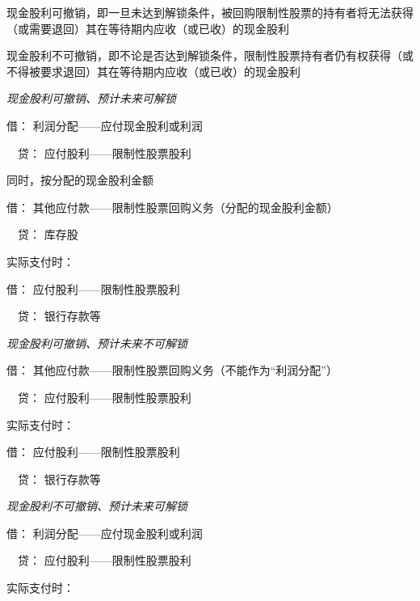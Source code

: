 \documentclass[UTF8,12pt]{ctexart}
\newenvironment{Dr}{\noindent 借：}{\par}
\newenvironment{Cr}{\noindent \ \ 贷：}{\par}
\numberwithin{equation}{section} %
\numberwithin{figure}{section}
\numberwithin{table}{section}
\begin{document}
	现金股利可撤销，即一旦未达到解锁条件，被回购限制性股票的持有者将无法获得（或需要退回）其在等待期内应收（或已收）的现金股利
	
	现金股利不可撤销，即不论是否达到解锁条件，限制性股票持有者仍有权获得（或不得被要求退回）其在等待期内应收（或已收）的现金股利
	
	\textit{现金股利可撤销、预计未来可解锁}
	
	\begin{Dr}
		利润分配——应付现金股利或利润
	\end{Dr}
	\begin{Cr}
		应付股利——限制性股票股利
	\end{Cr}

	同时，按分配的现金股利金额

	\begin{Dr}
		其他应付款——限制性股票回购义务（分配的现金股利金额）
	\end{Dr}
	\begin{Cr}
		库存股
	\end{Cr}

	实际支付时：
	
	\begin{Dr}
		应付股利——限制性股票股利
	\end{Dr}
	\begin{Cr}
		银行存款等
	\end{Cr}
	
	
	\textit{现金股利可撤销、预计未来不可解锁}
	
	\begin{Dr}
		其他应付款——限制性股票回购义务（不能作为“利润分配”）
	\end{Dr}
	\begin{Cr}
		应付股利——限制性股票股利
	\end{Cr}

	实际支付时：

	\begin{Dr}
		应付股利——限制性股票股利
	\end{Dr}
	\begin{Cr}
		银行存款等
	\end{Cr}
	
	
	\textit{现金股利不可撤销、预计未来可解锁}
	
	\begin{Dr}
		利润分配——应付现金股利或利润
	\end{Dr}
	\begin{Cr}
		应付股利——限制性股票股利
	\end{Cr}

	实际支付时：
	
\end{document}
